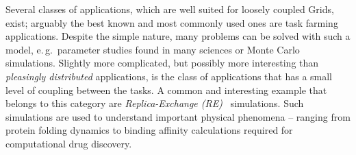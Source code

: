 \documentclass[conference,final]{IEEEtran}
\newcommand{\kimnote}[1]{ {\textcolor{green} { ***JK: #1 }}}
\newcommand{\jhanote}[1]{ {\textcolor{red} { ***SJ: #1 }}}
\newcommand{\kimnote}[1]{}
\newcommand{\jhanote}[1]{}
\newcommand{\up}{\vspace*{-1em}}
\begin{document}
\begin{abstract}
\end{abstract}

\up
{}
                           
\up Several classes of applications, which are well suited for loosely
coupled Grids, exist; arguably the best known and most commonly used
ones are task farming applications. Despite the simple nature, many
problems can be solved with such a model, e.\,g.\ parameter studies
found in many sciences or Monte Carlo simulations. Slightly more
complicated, but possibly more interesting than {\it pleasingly
  distributed} applications, is the class of applications that has a
small level of coupling between the tasks.  A common and interesting
example that belongs to this category are \emph{Replica-Exchange
  (RE)}~\cite{hansmann,Sugita:1999rm} simulations.  Such simulations
are used to understand important physical phenomena -- ranging from
protein folding dynamics to binding affinity calculations required for
computational drug discovery.

  

              
\end{document}
